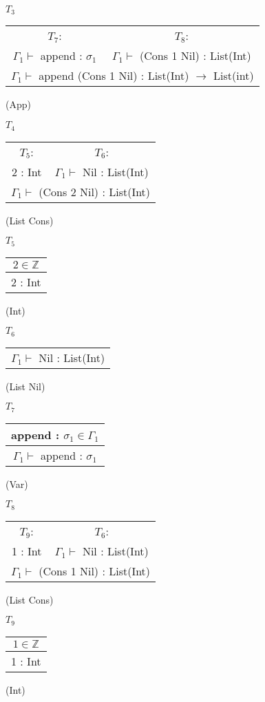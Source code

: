 \documentclass[12pt, a4paper]{article}
\begin{document}
\begin{enumerate}[(a)]
	$T_3$
	\begin{tabular}{c c}
		$T_7$: & $T_8$:\\
		$\Gamma_1 \vdash$ append : $\sigma_1$ & $\Gamma_1 \vdash$ (Cons 1 Nil) : List(Int)
		\\\hline
		\multicolumn{2}{c}{$\Gamma_1 \vdash$ append (Cons 1 Nil) : List(Int) $\rightarrow$ List(int)}
	\end{tabular}
	(App)

	$T_4$
	\begin{tabular}{c c}
		$T_5$: & $T_6$:\\
		2 : Int & $\Gamma_1 \vdash$ Nil : List(Int)
		\\\hline
		\multicolumn{2}{c}{$\Gamma_1 \vdash$ (Cons 2 Nil) : List(Int)}
	\end{tabular}
	(List Cons)

	$T_5$
	\begin{tabular}{c}
		$2 \in \mathbb{Z}$
		\\\hline
		2 : Int
	\end{tabular}
	(Int)

	$T_6$
	\begin{tabular}{c}
		\\\hline
		$\Gamma_1 \vdash$ Nil : List(Int)
	\end{tabular}
	(List Nil)

	$T_7$
	\begin{tabular}{c}
		append : $\sigma_1 \in \Gamma_1$
		\\\hline
		$\Gamma_1 \vdash$ append : $\sigma_1$
	\end{tabular}
	(Var)

	$T_8$
	\begin{tabular}{c c}
		$T_9$: &$T_6$:\\
		1 : Int & $\Gamma_1 \vdash$ Nil : List(Int)
		\\\hline
		\multicolumn{2}{c}{$\Gamma_1 \vdash$ (Cons 1 Nil) : List(Int)}
	\end{tabular}
	(List Cons)

	$T_9$
	\begin{tabular}{c}
		$1 \in \mathbb{Z}$
		\\\hline
		1 : Int
	\end{tabular}
	(Int)
\end{enumerate}

\section{} %
\end{document}
